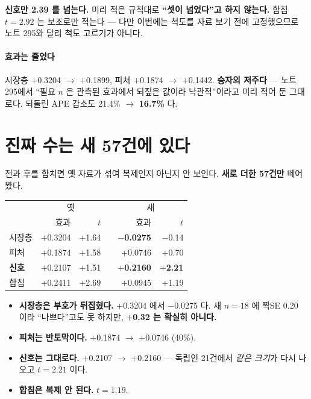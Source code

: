 \documentclass[10pt]{article}
\begin{document}
\textbf{신호만 2.39 를 넘는다.} 미리 적은 규칙대로 \textbf{``셋이 넘었다''고
하지 않는다.} 합침 $t{=}2.92$ 는 보조로만 적는다 --- 다만 이번에는 척도를
자료 보기 전에 고정했으므로 노트 295와 달리 척도 고르기가 아니다.

\paragraph{효과는 줄었다} 시장층 $+$0.3204 $\to$ $+$0.1899, 피처 $+$0.1874
$\to$ $+$0.1442. \textbf{승자의 저주다} --- 노트 295에서 ``필요 $n$ 은 관측된
효과에서 되짚은 값이라 낙관적''이라고 미리 적어 둔 그대로다. 되돌린 APE
감소도 21.4\% $\to$ \textbf{16.7\%} 다.

\section{진짜 수는 새 57건에 있다}

전과 후를 합치면 옛 자료가 섞여 복제인지 아닌지 안 보인다. \textbf{새로 더한
57건만} 떼어 봤다.

\begin{center}\footnotesize
\begin{tabular}{lrrlrr}
\hline
& \multicolumn{2}{c}{옛} & & \multicolumn{2}{c}{새} \\
& 효과 & $t$ & & 효과 & $t$ \\
\hline
시장층 & $+$0.3204 & $+$1.64 & & \textbf{$-$0.0275} & $-$0.14 \\
피처 & $+$0.1874 & $+$1.58 & & $+$0.0746 & $+$0.70 \\
\textbf{신호} & $+$0.2107 & $+$1.51 & & \textbf{$+$0.2160} & \textbf{$+$2.21} \\
\hline
합침 & $+$0.2411 & $+$2.69 & & $+$0.0945 & $+$1.19 \\
\hline
\end{tabular}
\end{center}

\begin{itemize}\itemsep2pt
\item \textbf{시장층은 부호가 뒤집혔다.} $+$0.3204 에서 $-$0.0275 다. 새
$n{=}18$ 에 짝SE 0.20 이라 ``나쁘다''고도 못 하지만, \textbf{$+$0.32 는
확실히 아니다.}
\item \textbf{피처는 반토막이다.} $+$0.1874 $\to$ $+$0.0746 (40\%).
\item \textbf{신호는 그대로다.} $+$0.2107 $\to$ $+$0.2160 --- 독립인 21건에서
\emph{같은 크기}가 다시 나오고 $t{=}2.21$ 이다.
\item \textbf{합침은 복제 안 된다.} $t{=}1.19$.
\end{itemize}
\end{document}
